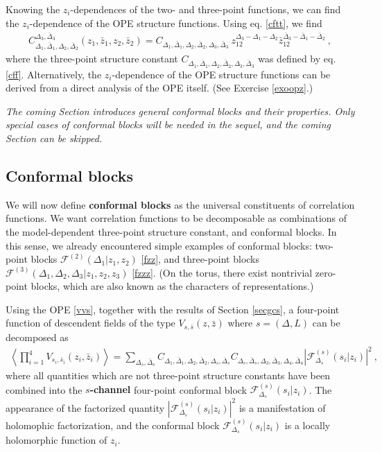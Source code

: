 \documentclass[12pt, a4paper, notitlepage, twoside]{report}
\numberwithin{equation}{section}
\theoremstyle{break}
\begin{document}
Knowing the $z_i$-dependences of the two- and three-point functions, we can find the $z_i$-dependence of the OPE structure functions.
Using eq. \eqref{cftt}, we find 
\begin{align}
 \boxed{C_{\Delta_1,\bar{\Delta}_1,\Delta_2,\bar{\Delta}_2}^{\Delta_3,\bar{\Delta}_3}(z_1,\bar{z}_1,z_2,\bar{z}_2) = C_{\Delta_1,\bar{\Delta}_1,\Delta_2,\bar{\Delta}_2,\Delta_3,\bar{\Delta}_3}\ z_{12}^{\Delta_3-\Delta_1-\Delta_2}  \bar{z}_{12}^{\bar{\Delta}_3-\bar{\Delta}_1-\bar{\Delta}_2}}\ ,
\label{ccz}
\end{align}
where the three-point structure constant $C_{\Delta_1,\bar{\Delta}_1,\Delta_2,\bar{\Delta}_2,\Delta_3,\bar{\Delta}_3}$ was defined by eq. \eqref{cff}.
Alternatively, the $z_i$-dependence of the OPE structure functions can be derived from a direct analysis of the OPE itself. (See Exercise \ref{exoopz}.)

\vspace{2mm} 

\textit{The coming Section introduces general conformal blocks and their properties.
Only special cases of conformal blocks will be needed in the sequel, and the coming Section can be skipped.}

\subsection{Conformal blocks \label{secaco}}

We will now define \textbf{\boldmath conformal blocks} as the universal constituents of correlation functions. 
We want correlation functions to be decomposable as combinations of the model-dependent three-point structure constant, and conformal blocks.
In this sense, we already encountered simple examples of conformal blocks: two-point blocks $\mathcal{F}^{(2)}(\Delta_1|z_1,z_2)$ \eqref{fzz}, and three-point blocks $\mathcal{F}^{(3)}(\Delta_1,\Delta_2,\Delta_3|z_1,z_2,z_3)$ \eqref{fzzz}. (On the torus, there exist nontrivial zero-point blocks, which are also known as the characters of representations.)

Using the OPE \eqref{vvs}, together with the results of Section \ref{secgcs}, a four-point function of descendent fields of the type $V_{s,\bar{s}}(z,\bar{z})$ where $s=(\Delta,L)$ can be decomposed as 
\begin{align}
 \left\langle \prod_{i=1}^4 V_{s_i,\bar{s}_i}(z_i,\bar{z}_i)\right\rangle = \sum_{\Delta_s,\bar{\Delta}_s} C_{\Delta_1,\bar{\Delta}_1,\Delta_2,\bar{\Delta}_2,\Delta_s,\bar{\Delta}_s} C_{\Delta_s,\bar{\Delta}_s,\Delta_3,\bar{\Delta}_3,\Delta_4,\bar{\Delta}_4} \left| \mathcal{F}^{(s)}_{\Delta_s}(s_i|z_i)\right|^2\ ,
\label{fsd}
\end{align}
where all quantities which are not three-point structure constants have been combined into the \textbf{\boldmath $s$-channel} four-point conformal block $\mathcal{F}^{(s)}_{\Delta_s}(s_i|z_i)$.
The appearance of the factorized quantity $\left| \mathcal{F}^{(s)}_{\Delta_s}(s_i|z_i)\right|^2$ is a manifestation of holomophic factorization, and the conformal block $\mathcal{F}^{(s)}_{\Delta_s}(s_i|z_i)$ is a locally holomorphic function of $z_i$. 
\end{document}
